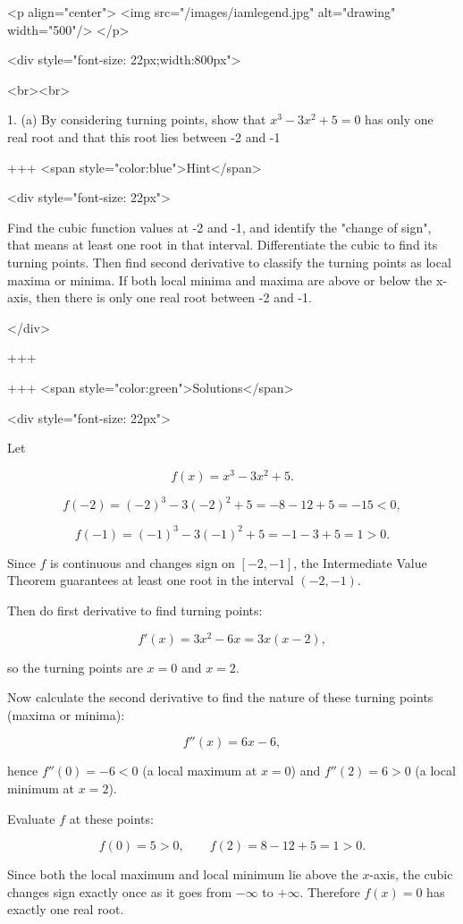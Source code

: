 <p align="center">
<img src="/images/iamlegend.jpg" alt="drawing" width="500"/>
</p>

<div style="font-size: 22px;width:800px">

<br><br>

1. (a) By considering turning points, show that $x^{3}-3 x^{2}+5=0$ has only one real root and that this root lies between -2 and -1

+++ <span style="color:blue">Hint</span>


<div style="font-size: 22px">

Find the cubic function values at -2 and -1, and identify the "change of sign", that means at least one root in that interval.
Differentiate the cubic to find its turning points. Then find second derivative to classify the turning points as local maxima or minima. If both local minima and maxima are above or below the x-axis, then there is only one real root between -2 and -1.

</div>

+++

+++ <span style="color:green">Solutions</span>

<div style="font-size: 22px">

Let

$$
f(x)=x^{3}-3x^{2}+5.
$$

$$
f(-2)=(-2)^{3}-3(-2)^{2}+5=-8-12+5=-15<0,
$$

$$
f(-1)=(-1)^{3}-3(-1)^{2}+5=-1-3+5=1>0.
$$

Since $f$ is continuous and changes sign on $[-2,-1]$, the Intermediate Value Theorem guarantees at least one root in the interval $(-2,-1)$.

Then do first derivative to find turning points:

$$
f'(x)=3x^{2}-6x=3x(x-2),
$$

so the turning points are $x=0$ and $x=2$. 

Now calculate the second derivative to find the nature of these turning points (maxima or minima):

$$
f''(x)=6x-6,
$$

hence $f''(0)=-6<0$ (a local maximum at $x=0$) and $f''(2)=6>0$ (a local minimum at $x=2$).

Evaluate $f$ at these points:

$$
f(0)=5>0,\qquad f(2)=8-12+5=1>0.
$$

Since both the local maximum and local minimum lie above the $x$-axis, the cubic changes sign exactly once as it goes from $-\infty$ to $+\infty$. Therefore $f(x)=0$ has exactly one real root.

